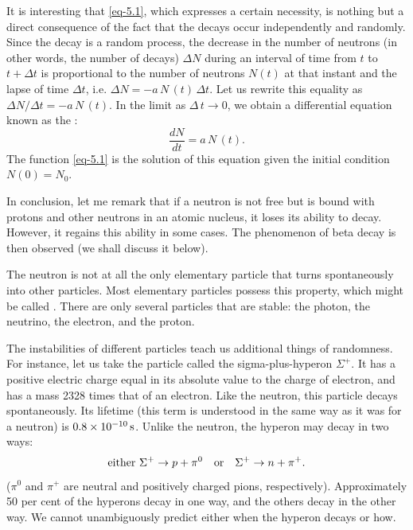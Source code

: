It is interesting that \eqref{eq-5.1}, which expresses a certain necessity, is
nothing but a direct consequence of the fact that the decays occur
independently and randomly. Since the decay is a random process, the
decrease in the number of neutrons (in other words, the number of
decays) $\Delta N$ during an interval of time from $t$ to $t + \Delta t$ is proportional to the number of neutrons $N (t)$ at that instant and the lapse of time $\Delta t$, i.e. $ \Delta N = - a \, N \, (t) \, \Delta t$. Let us rewrite this equality as   $ \Delta N / \Delta t  = - a \, N \, (t)$. In the
limit as $ \Delta \, t \to 0$, we obtain a differential equation known as the :
\begin{equation}%
\frac{dN}{dt} = a \, N \, (t).
\label{eq-5.2}
\end{equation}
The function \eqref{eq-5.1} is the solution of this equation given the initial condition $N (0) = N_{0}$.

In conclusion, let me remark that if a neutron is not free but is bound
with protons and other neutrons in an atomic nucleus, it loses its ability
to decay. However, it regains this ability in some cases. The
phenomenon of beta decay is then observed (we shall discuss it below).

 The neutron is not at all the only elementary particle that turns spontaneously into other particles.
Most elementary particles possess this property, which might be called
. There are only several particles that are stable: the photon, the neutrino, the electron, and the proton.

The instabilities of different particles teach us additional things of
randomness. For instance, let us take the particle called the sigma-plus-hyperon $\Sigma^{+}$. It has a positive electric charge equal in its absolute value to the charge of electron, and has a mass 2328 times that of an electron. Like the neutron, this particle decays spontaneously. Its lifetime (this term is understood in the same way as it was for a neutron) is $0.8 \times \SI{d-10}{\second}$. Unlike the neutron, the hyperon may decay in two ways: 
\begin{equation*}%
\text{either} \,\,  \Sigma^{+} \to p + \pi^{0}  \qor  \Sigma^{+} \to n + \pi^{+}.
\end{equation*}
($\pi^{0}$ and $\pi^{+}$ are neutral and positively charged pions, respectively).  Approximately 50 per cent of the hyperons decay in one way, and the others decay in the other way. We cannot unambiguously predict either when the hyperon decays or how.

